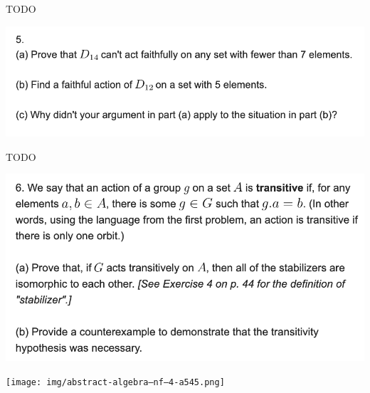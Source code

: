 TODO





\begin{mdframed}
\includegraphics[width=400pt]{img/abstract-algebra--nf--4-1b73.png}
\end{mdframed}

TODO


\begin{mdframed}
\includegraphics[width=400pt]{img/abstract-algebra--nf--4-50ae.png}
\end{mdframed}

\begin{intuition*}
  \begin{mdframed}
\texttt{[image: img/abstract-algebra--nf--4-a545.png]}
\end{mdframed}
\end{intuition*}

